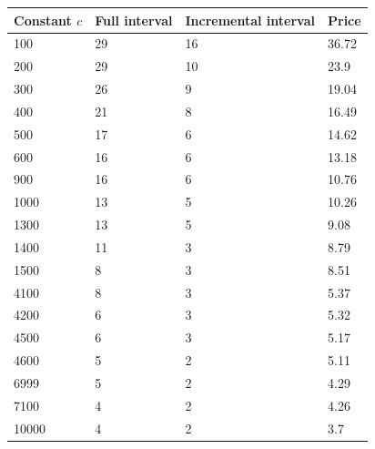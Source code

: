\documentclass[11pt, a4paper]{article}
\theoremstyle{definition}
\begin{document}
\begin{center}\label{table_clean}
	\begin{tabular}{| l | l | l | l |}
		\hline
		Constant $c$ & Full interval & Incremental interval & Price\\ \hline
		100 & 29 & 16 & 36.72\\ \hline
		200 & 29 & 10 & 23.9\\ \hline
		300 & 26 & 9 & 19.04\\ \hline
		400 & 21 & 8 & 16.49\\ \hline
		500 & 17 & 6 & 14.62\\ \hline
		600 & 16 & 6 & 13.18\\ \hline
		900 & 16 & 6 & 10.76\\ \hline
		1000 & 13 & 5 & 10.26\\ \hline
		1300 & 13 & 5 & 9.08\\ \hline
		1400 & 11 & 3 & 8.79\\ \hline
		1500 & 8 & 3 & 8.51\\ \hline
		4100 & 8 & 3 & 5.37\\ \hline
		4200 & 6 & 3 & 5.32\\ \hline
		4500 & 6 & 3 & 5.17\\ \hline
		4600 & 5 & 2 & 5.11\\ \hline
		6999 & 5 & 2 & 4.29\\ \hline
		7100 & 4 & 2 & 4.26\\ \hline
		10000 & 4 & 2 & 3.7\\ \hline
	\end{tabular}
\end{center}
\end{document}
